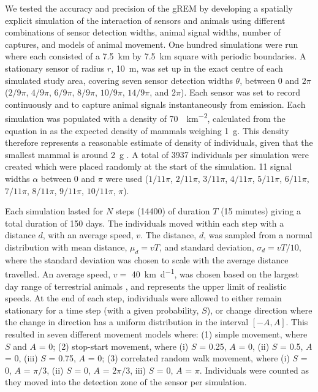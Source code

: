 We tested the accuracy and precision of the gREM by developing a spatially explicit simulation of the interaction of sensors and animals using different combinations of sensor detection widths, animal signal widths, number of captures, and models of animal movement.
One hundred simulations were run where each consisted of a  \SI{7.5}{\kilo\meter} by \SI{7.5}{\kilo\meter} square with periodic boundaries.
A stationary sensor of radius $r$, \SI{10}{\meter}, was set up in the exact centre of each simulated study area, covering seven sensor detection widths $\theta$, between 0 and $2\pi$ ($2/9\pi$, $4/9\pi$, $6/9\pi$, $8/9\pi$, $10/9\pi$, $14/9\pi$, and $2\pi$).
Each sensor was set to record continuously and to capture animal signals instantaneously from emission.
Each simulation was populated with a density of \SI{70}{\animals\per\kilo\meter\squared}, calculated from the equation in \cite{damuth1981population} as the expected density of mammals weighing \SI{1}{\gram}.
This density therefore represents a reasonable estimate of density of individuals, given that the smallest mammal is around \SI{2}{\gram} \cite{jones2009pantheria}.
A total of 3937 individuals per simulation were created which were placed randomly at the start of the simulation. 11 signal widths $\alpha$ between 0 and $\pi$ were used ($1/11\pi$, $2/11\pi$, $3/11\pi$, $4/11\pi$, $5/11\pi$, $6/11\pi$, $7/11\pi$, $8/11\pi$, $9/11\pi$, $10/11\pi$, $\pi$). 

Each simulation lasted for $N$ steps (14400) of duration $T$ (15 minutes) giving a total duration of 150 days.
The individuals moved within each step with a distance $d$, with an average speed, $v$.
The distance, $d$, was sampled from a normal distribution with mean distance, $\mu_d = vT$, and standard deviation, $\sigma_d = vT/10$, where the standard deviation was chosen to scale with the average distance travelled.
An average speed, $v = $ \SI{40}{\kilo\meter \per \day}, was chosen based on the largest day range of terrestrial animals \cite{carbone2005far}, and represents the upper limit of realistic speeds.
At the end of each step, individuals were allowed to either remain stationary for a time step (with a given probability, $S$), or change direction where the change in direction has a uniform distribution in the interval $\left[-A, A\right]$.
This resulted in seven different movement models where: (1) simple movement, where $S$ and $A$ = 0; (2) stop-start movement, where (i) $S$ = 0.25, $A$ = 0, (ii) $S$ = 0.5, $A$ = 0, (iii) $S$ = 0.75, $A$ = 0; (3) correlated random walk movement, where (i) $S$ = 0, $A$ = $\pi/3$, (ii) $S$ = 0, $A$ = $2\pi/3$, iii) $S$ = 0, $A$ = $\pi$.
Individuals were counted as they moved into the detection zone of the sensor per simulation. 

